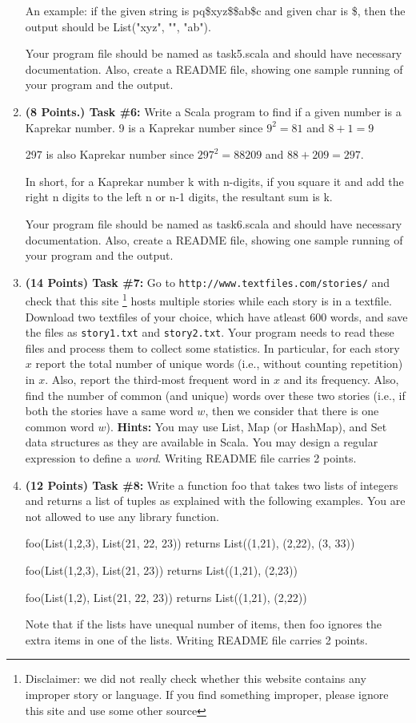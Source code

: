 \documentclass[paper=letter, fontsize=11pt]{scrartcl} %
\begin{document}
\begin{enumerate}
An example: if the given string is pq\$xyz\$\$ab\$c and given char is \$, 
then the output should be List("xyz", "", "ab"). 

Your program file should be named as task5.scala and should have necessary documentation. 
Also, create a README file, showing one sample running of your program and the output.

\item \textbf{(8 Points.) Task \#6:} Write a Scala program to find 
if a given number is a Kaprekar number. 
9 is a Kaprekar number since
$9^2 = 81$ and $8 + 1 = 9$

297 is also Kaprekar number since
$297^2 = 88209$ and $88 + 209 = 297$.

In short, for a Kaprekar number k with n-digits, 
if you square it and add the right n digits to the left n or n-1 digits, the resultant sum is k. 

Your program file should be named as task6.scala and should have necessary documentation.
Also, create a README file, showing one sample running of your program and the output.

 \item \textbf{(14 Points) Task \#7:} Go to \texttt{http://www.textfiles.com/stories/} and check that this site
\footnote {Disclaimer: we did not really check whether this website contains any improper story or language.
If you find something improper, please ignore this site and use some other source} hosts multiple stories
while each story is in a textfile. Download two textfiles of your choice, which have atleast 600 words,
and save the files as \texttt{story1.txt} and \texttt{story2.txt}.
Your program needs to read these files and process
them to collect some statistics. In particular, for each story $x$ report the total number of unique words 
(i.e., without counting repetition) in $x$. Also, report
the third-most frequent word in $x$ and its frequency. 
Also, find the number of common (and unique) words over these two stories
(i.e., if both the stories have a same word $w$, then we consider that there is one common word $w$).
\textbf {Hints:} You may use List, Map (or HashMap), and Set data structures as they are available in Scala.
You may design a regular expression to define a \emph{word}.
Writing README file carries 2 points.

 \item \textbf{(12 Points) Task \#8:}  Write a function foo that takes two lists of integers and returns a  
list of tuples as explained with the following examples. You are not allowed to use any library function.

foo(List(1,2,3), List(21, 22, 23)) returns List((1,21), (2,22), (3, 33))

foo(List(1,2,3), List(21, 23)) returns List((1,21), (2,23))

foo(List(1,2), List(21, 22, 23)) returns List((1,21), (2,22))

Note that if the lists have unequal number of items, then foo ignores the extra items in one of the lists.
Writing README file carries 2 points.

    \end{enumerate}
\end{document}
